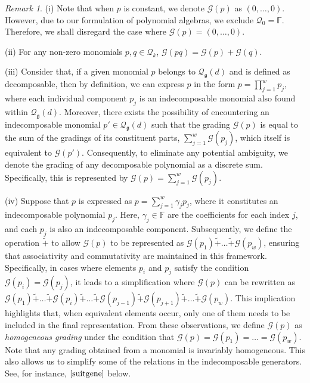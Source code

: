 \documentclass[10pt]{amsart}
\theoremstyle{definition}
\theoremstyle{corollary}
\theoremstyle{remark}
\newtheorem{remark}[theorem]{Remark}
\theoremstyle{conclusion}
\begin{document}
\begin{remark}
\label{re2.4}
  (i) Note that when $p$ is constant, we denote $\mathcal{G}(p)$ as $(0, \ldots, 0)$. However, due to our formulation of polynomial algebras, we exclude $\mathcal{Q}_0 = \mathbb{F}$. Therefore, we shall disregard the case where $\mathcal{G}(p) = (0, \ldots, 0)$.

  (ii) For any non-zero monomials $p ,q \in \mathcal{Q}_k$,  $\mathcal{G}(pq) = \mathcal{G}(p) + \mathcal{G}(q)$.

 (iii) Consider that, if a given monomial $p$ belongs to $\mathcal{Q}_\mathfrak{g}(d)$ and is defined as decomposable, then by definition, we can express $p$ in the form $p = \prod_{j=1}^w p_j$, where each individual component $p_j$ is an indecomposable monomial also found within $\mathcal{Q}_\mathfrak{g}(d)$. Moreover, there exists the possibility of encountering an indecomposable monomial $p' \in \mathcal{Q}_\mathfrak{g}(d)$ such that the grading $\mathcal{G}(p)$ is equal to the sum of the gradings of its constituent parts, $\sum_{j=1}^w \mathcal{G}(p_j)$, which itself is equivalent to $\mathcal{G}(p')$. Consequently, to eliminate any potential ambiguity, we denote the grading of any decomposable polynomial as a discrete sum. Specifically, this is represented by $\mathcal{G}(p) = \sum_{j=1}^w \mathcal{G}(p_j)  $.
 
(iv) Suppose that $p$ is expressed as $p = \sum_{j=1}^w \gamma_j p_j$, where it constitutes an indecomposable polynomial $p_j$. Here, $\gamma_j \in \mathbb{F}$ are the coefficients for each index $j$, and each $p_j$ is also an indecomposable component. Subsequently, we define the operation $\tilde{+}$ to allow $\mathcal{G}(p)$ to be represented as $\mathcal{G}(p_1) \tilde{+} \ldots \tilde{+} \mathcal{G}(p_w)$, ensuring that associativity and commutativity are maintained in this framework. Specifically, in cases where elements $p_i$ and $p_j$ satisfy the condition $\mathcal{G}(p_i) = \mathcal{G}(p_j)$, it leads to a simplification where $\mathcal{G}(p)$ can be rewritten as $\mathcal{G}(p_1) \tilde{+} \ldots \tilde{+} \mathcal{G}(p_i) \tilde{+} \ldots \tilde{+} \mathcal{G}(p_{j-1}) \tilde{+} \mathcal{G}(p_{j+1})  \tilde{+} \ldots \tilde{+} \mathcal{G}(p_w)$. This implication highlights that, when equivalent elements occur, only one of them needs to be included in the final representation. From these observations, we define $\mathcal{G}(p)$ as \textit{homogeneous grading} under the condition that $\mathcal{G}(p) = \mathcal{G}(p_1) = \ldots = \mathcal{G}(p_w)$. Note that any grading obtained from a monomial is invariably homogeneous. This also allows us to simplify some of the relations in the indecomposable generators. See, for instance, $\eqref{suitgene}$ below. %
\end{remark}
\end{document}
